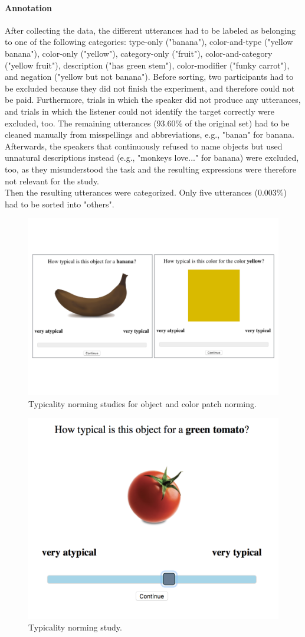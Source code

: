 \documentclass[10pt,letterpaper]{article}
\begin{document}
\paragraph{Annotation}
After collecting the data, the different utterances had to be labeled as belonging to one of the following categories: type-only ("banana"), color-and-type ("yellow banana"),  color-only ("yellow"), category-only ("fruit"), color-and-category ("yellow fruit"), description ("has green stem"), color-modifier ("funky carrot"), and negation ("yellow but not banana"). Before sorting, two participants had to be excluded because they did not finish the experiment, and therefore could not be paid. Furthermore, trials in which the speaker did not produce any utterances, and trials in which the listener could not identify the target correctly were excluded, too. The remaining utterances (93.60\% of the original set) had to be cleaned manually from misspellings and abbreviations, e.g., "banan" for banana. Afterwards, the speakers that continuously refused to name objects but used unnatural descriptions instead (e.g., "monkeys love..." for banana) were excluded, too, as they misunderstood the task and the resulting expressions were therefore not relevant for the study.\\
Then the resulting utterances were categorized. Only five utterances (0.003\%) had to be sorted into "others".

\begin{figure}[bt!]
	\centering
	\includegraphics[width=.5\textwidth]{graphs/design_2}
	\caption{Typicality norming studies for object and color patch norming.
	}
	\label{fig:design_2}
\end{figure}

\begin{figure}[bt!]
	\centering
	\includegraphics[width=.5\textwidth]{graphs/typ_norm_full_2}
	\caption{Typicality norming study.
	}
	\label{fig:typ_norm_full_2}
\end{figure}
\end{document}
